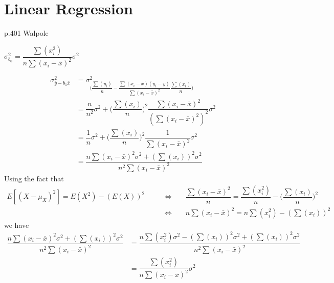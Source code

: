 \section{Linear Regression}

p.401 Walpole\\[2ex]
\begin{center}
    $\sigma_{b_{0}}^{2} = \dfrac{\sum(x_{i}^{2})}{n\sum(x_{i} - \bar{x})^{2}}\sigma^{2}$
\end{center}
\begin{align*}
    \sigma_{\bar{y} - b_{1}\bar{x}}^{2} &= \sigma_{\Big(\dfrac{\sum(y_{i})}{n} - \dfrac{\sum(x_{i} - \bar{x})(y_{i} - \bar{y})}{\sum(x_{i} - \bar{x})^{2}}\dfrac{\sum(x_{i})}{n}\Big)}^{2}\\[1ex]
    &= \dfrac{n}{n^{2}}\sigma^{2} + \Big(\dfrac{\sum(x_{i})}{n}\Big)^{2}\dfrac{\sum(x_{i} - \bar{x})^{2}}{(\sum(x_{i} - \bar{x})^{2})^{2}}\sigma^{2}\\[1ex]
    &= \dfrac{1}{n}\sigma^{2} + \Big(\dfrac{\sum(x_{i})}{n}\Big)^{2}\dfrac{1}{\sum(x_{i} - \bar{x})^{2}}\sigma^{2}\\[1ex]
    &= \dfrac{n\sum(x_{i} - \bar{x})^{2}\sigma^{2} + (\sum(x_{i}))^{2}\sigma^{2}}{n^{2}\sum(x_{i} - \bar{x})^{2}}
\end{align*}
Using the fact that
\begin{align*}
    E[(X - \mu_{X})^{2}] = E(X^{2}) - (E(X))^{2} \hspace{20pt} &\Longleftrightarrow \hspace{20pt} \dfrac{\sum(x_{i} - \bar{x})^{2}}{n} = \dfrac{\sum(x_{i}^{2})}{n} - \Big(\dfrac{\sum(x_{i})}{n}\Big)^{2}\\[1ex]
    &\Longleftrightarrow \hspace{20pt} n\sum(x_{i} - \bar{x})^{2} = n\sum(x_{i}^{2}) - (\sum(x_{i}))^{2}
\end{align*}
we have
\begin{align*}
    \dfrac{n\sum(x_{i} - \bar{x})^{2}\sigma^{2} + (\sum(x_{i}))^{2}\sigma^{2}}{n^{2}\sum(x_{i} - \bar{x})^{2}} &= \dfrac{n\sum(x_{i}^{2})\sigma^{2} - (\sum(x_{i}))^{2}\sigma^{2} + (\sum(x_{i}))^{2}\sigma^{2}}{n^{2}\sum(x_{i} - \bar{x})^{2}}\\[1ex]
    &= \dfrac{\sum(x_{i}^{2})}{n\sum(x_{i} - \bar{x})^{2}}\sigma^{2}
\end{align*}



